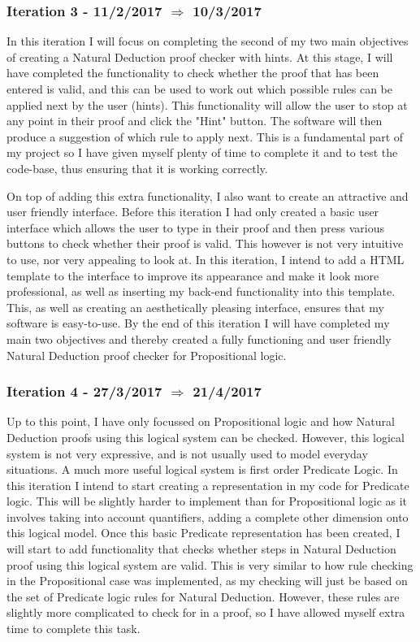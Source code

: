 \subsubsection{Iteration 3 - 11/2/2017 $\Rightarrow$ 10/3/2017}

In this iteration I will focus on completing the second of my two main objectives of creating a Natural Deduction proof checker with hints. At this stage, I will have completed the functionality to check whether the proof that has been entered is valid, and this can be used to work out which possible rules can be applied next by the user (hints). This functionality will allow the user to stop at any point in their proof and click the "Hint" button. The software will then produce a suggestion of which rule to apply next. This is a fundamental part of my project so I have given myself plenty of time to complete it and to test the code-base, thus ensuring that it is working correctly.

On top of adding this extra functionality, I also want to create an attractive and user friendly interface. Before this iteration I had only created a basic user interface which allows the user to type in their proof and then press various buttons to check whether their proof is valid. This however is not very intuitive to use, nor very appealing to look at. In this iteration, I intend to add a HTML template to the interface to improve its appearance and make it look more professional, as well as inserting my back-end functionality into this template. This, as well as creating an aesthetically pleasing interface, ensures that my software is easy-to-use. By the end of this iteration I will have completed my main two objectives and thereby created a fully functioning and user friendly Natural Deduction proof checker for Propositional logic.

\subsubsection{Iteration 4 - 27/3/2017 $\Rightarrow$ 21/4/2017}

Up to this point, I have only focussed on Propositional logic and how Natural Deduction proofs using this logical system can be checked. However, this logical system is not very expressive, and is not usually used to model everyday situations. A much more useful logical system is first order Predicate Logic. In this iteration I intend to start creating a representation in my code for Predicate logic. This will be slightly harder to implement than for Propositional logic as it involves taking into account quantifiers, adding a complete other dimension onto this logical model. Once this basic Predicate representation has been created, I will start to add functionality that checks whether steps in Natural Deduction proof using this logical system are valid. This is very similar to how rule checking in the Propositional case was implemented, as my checking will just be based on the set of Predicate logic rules for Natural Deduction. However, these rules are slightly more complicated to check for in a proof, so I have allowed myself extra time to complete this task. 

